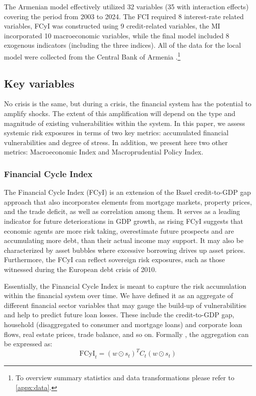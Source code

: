 \documentclass[12pt,a4paper]{article}
\begin{document}
The Armenian model effectively utilized 32 variables (35 with interaction effects) covering the period from 2003 to 2024. The FCI required 8 interest-rate related variables, FCyI was constructed using 9 credit-related variables, the MI incorporated 10 macroeconomic variables, while the final model included 8 exogenous indicators (including the three indices). All of the data for the local model were collected from the Central Bank of Armenia \citep{cba2024}.\footnote{To overview summary statistics and data transformations please refer to \ref{appx:data}.}

\subsection{Key variables}
No crisis is the same, but during a crisis, the financial system has the potential to amplify shocks. The extent of this amplification will depend on the type and magnitude of existing vulnerabilities within the system. In this paper, we assess systemic risk exposures in terms of two key metrics: accumulated financial vulnerabilities and degree of stress. In addition, we present here two other metrics: Macroeconomic Index and Macroprudential Policy Index.

\subsubsection{Financial Cycle Index}
The Financial Cycle Index (FCyI) \citep{hollo2012, plasil2014} is an extension of the Basel credit-to-GDP gap approach \citep{basel2010} that also incorporates elements from mortgage markets, property prices, and the trade deficit, as well as correlation among them. It serves as a leading indicator for future deteriorations in GDP growth, as rising FCyI suggests that economic agents are more risk taking, overestimate future prospects and are accumulating more debt, than their actual income may support. It may also be characterized by asset bubbles where excessive borrowing drives up asset prices. Furthermore, the FCyI can reflect sovereign risk exposures, such as those witnessed during the European debt crisis of 2010.

Essentially, the Financial Cycle Index is meant to capture the risk accumulation within the financial system over time. We have defined it as an aggregate of different financial sector variables that may gauge the build-up of vulnerabilities and help to predict future loan losses. These include the credit-to-GDP gap, household (disaggregated to consumer and mortgage loans) and corporate loan flows, real estate prices, trade balance, and so on. Formally \citep{hollo2012}, the aggregation can be expressed as:
\begin{equation}
    \label{eq:fcyi}
    \text{FCyI}_t = (w\odot s_t)^T C_t (w\odot s_t)
\end{equation}
\end{document}
